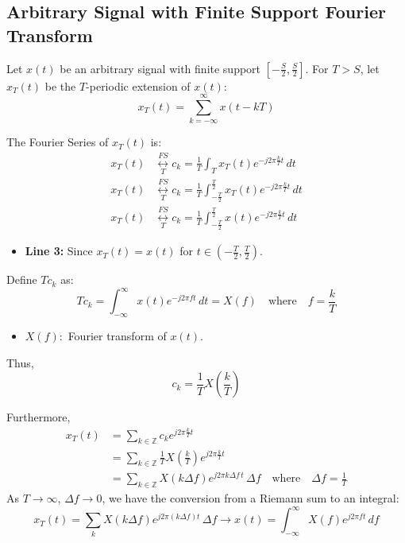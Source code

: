 \subsection{Arbitrary Signal with Finite Support Fourier Transform}
\begin{derivation}
    Let \( x(t) \) be an arbitrary signal with finite support \( \left[ -\frac{S}{2}, \frac{S}{2} \right] \). For \( T > S \), let \( x_T(t) \) be the \( T \)-periodic extension of \( x(t) \):
    \[
    x_T(t) = \sum_{k=-\infty}^{\infty} x(t - kT)
    \]

    The Fourier Series of \( x_T(t) \) is:
    \begin{align*}
        x_T(t) &\underset{T}{\overset{FS}{\leftrightarrow}} c_k = \frac{1}{T} \int_{T} x_T(t) e^{-j 2 \pi \frac{k}{T} t} \, dt \\
        x_T(t) &\underset{T}{\overset{FS}{\leftrightarrow}} c_k = \frac{1}{T} \int_{-\frac{T}{2}}^{\frac{T}{2}} x_T(t) e^{-j 2 \pi \frac{k}{T} t} \, dt \\ 
        x_T(t) &\underset{T}{\overset{FS}{\leftrightarrow}} c_k = \frac{1}{T} \int_{-\frac{T}{2}}^{\frac{T}{2}} x(t) e^{-j 2 \pi \frac{k}{T} t} \, dt
    \end{align*}
    \begin{itemize}
        \item \textbf{Line 3:} Since \( x_T(t) = x(t) \) for \( t \in \left( -\frac{T}{2}, \frac{T}{2} \right) \).
    \end{itemize}

    Define \( T c_k \) as:
    \[
    T c_k = \int_{-\infty}^{\infty} x(t) e^{-j 2 \pi f t} \, dt = X(f) \quad \text{where} \quad f = \frac{k}{T}
    \]
    \begin{itemize}
        \item $X(f):$ Fourier transform of $x(t)$.
    \end{itemize}
    Thus,
    \[
    c_k = \frac{1}{T} X\left( \frac{k}{T} \right)
    \]
    \vspace{1em}

    Furthermore, 
    \begin{align*}
        x_T(t) &= \sum_{k \in \mathbb{Z}} c_k e^{j 2 \pi \frac{k}{T} t} \\
               &= \sum_{k \in \mathbb{Z}} \frac{1}{T} X\left( \frac{k}{T} \right) e^{j 2 \pi \frac{k}{T} t} \\
               &= \sum_{k \in \mathbb{Z}} X\left( k \Delta f \right) e^{j 2 \pi k \Delta f \, t} \, \Delta f \quad \text{where} \quad \Delta f = \frac{1}{T}
    \end{align*}    
    As \( T \to \infty \), \( \Delta f \to 0 \), we have the conversion from a Riemann sum to an integral:
    \begin{equation*}
        x_T(t) = \sum_{k} X\left( k \Delta f \right) e^{j 2 \pi (k \Delta f) t} \, \Delta f \to x(t) = \int_{-\infty}^{\infty} X(f) e^{j 2 \pi f t} \, df
    \end{equation*}
\end{derivation}

